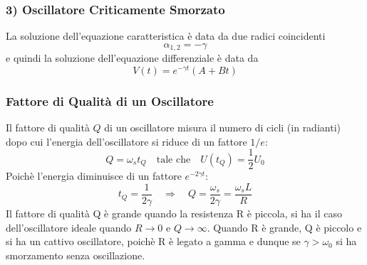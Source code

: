 \subsubsection{3) Oscillatore Criticamente Smorzato}
La soluzione dell'equazione caratteristica \`e data da due radici coincidenti
\begin{equation*}
	\alpha_{1,2} = - \gamma 
\end{equation*}
e quindi la soluzione dell'equazione differenziale \`e data da
\begin{equation*}
	V(t) = e^{-\gamma t} (A+Bt)
\end{equation*}

\subsubsection{Fattore di Qualit\`a di un Oscillatore}

Il fattore di qualit\`a $Q$ di un oscillatore misura il numero di cicli (in radianti) dopo cui l'energia dell'oscillatore si riduce di un fattore $1/e$:
\begin{equation*}
	Q = \omega_s t_Q \quad \text{tale che} \quad U(t_Q) = \frac{1}{2}U_0 
\end{equation*}
Poich\`e l'energia diminuisce di un fattore $e^{-2 \gamma t}$:
\begin{equation*}
	t_Q = \frac{1}{2 \gamma} \quad \Rightarrow \quad Q = \frac{\omega_s}{2 \gamma} = \frac{\omega_s L}{R}
\end{equation*}
Il fattore di qualit\`a Q \`e grande quando la resistenza R \`e piccola, si ha il caso dell'oscillatore ideale quando $R \to 0 $ e $Q \to \infty$. Quando R \`e grande, Q \`e piccolo e si ha un cattivo oscillatore, poich\`e R \`e legato a gamma e dunque se $\gamma > \omega_0$ si ha smorzamento senza oscillazione.
\newpage
